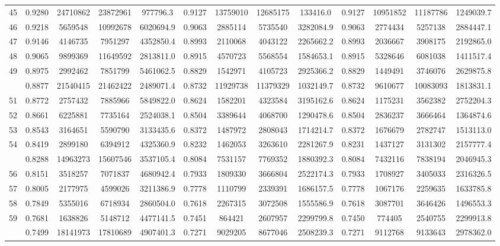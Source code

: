 \documentclass[
  12pt,
]{article}
\begin{document}
\begin{longtable}[t]{lcccccccccccc}
45 & 0.9280 & 24710862 & 23872961 & 977796.3 & 0.9127 & 13759010 & 12685175 & 133416.0 & 0.9127 & 10951852 & 11187786 & 1249039.7\\
46 & 0.9218 & 5659548 & 10992678 & 6020694.9 & 0.9063 & 2885114 & 5735540 & 3282084.9 & 0.9063 & 2774434 & 5257138 & 2884447.1\\
47 & 0.9146 & 4146735 & 7951297 & 4352850.4 & 0.8993 & 2110068 & 4043122 & 2265662.2 & 0.8993 & 2036667 & 3908175 & 2192865.0\\
48 & 0.9065 & 9899369 & 11649592 & 2813811.0 & 0.8915 & 4570723 & 5568554 & 1584653.1 & 0.8915 & 5328646 & 6081038 & 1411517.4\\
49 & 0.8975 & 2992462 & 7851799 & 5461062.5 & 0.8829 & 1542971 & 4105723 & 2925366.2 & 0.8829 & 1449491 & 3746076 & 2629875.8\\
\addlinespace
50 & 0.8877 & 21540415 & 21462422 & 2489071.4 & 0.8732 & 11929738 & 11379329 & 1032149.7 & 0.8732 & 9610677 & 10083093 & 1813831.1\\
51 & 0.8772 & 2757432 & 7885966 & 5849822.0 & 0.8624 & 1582201 & 4323584 & 3195162.6 & 0.8624 & 1175231 & 3562382 & 2752204.3\\
52 & 0.8661 & 6225881 & 7735164 & 2524038.1 & 0.8504 & 3389644 & 4068700 & 1290478.6 & 0.8504 & 2836237 & 3666464 & 1364874.6\\
53 & 0.8543 & 3164651 & 5590790 & 3133435.6 & 0.8372 & 1487972 & 2808043 & 1714214.7 & 0.8372 & 1676679 & 2782747 & 1513113.0\\
54 & 0.8419 & 2899180 & 6394912 & 4325360.9 & 0.8232 & 1462053 & 3263610 & 2281267.9 & 0.8231 & 1437127 & 3131302 & 2157777.4\\
\addlinespace
55 & 0.8288 & 14963273 & 15607546 & 3537105.4 & 0.8084 & 7531157 & 7769352 & 1880392.3 & 0.8084 & 7432116 & 7838194 & 2046945.3\\
56 & 0.8151 & 3518257 & 7071837 & 4680942.4 & 0.7933 & 1809330 & 3666804 & 2522174.3 & 0.7933 & 1708927 & 3405033 & 2316326.5\\
57 & 0.8005 & 2177975 & 4599026 & 3211386.9 & 0.7778 & 1110799 & 2339391 & 1686157.5 & 0.7778 & 1067176 & 2259635 & 1633785.8\\
58 & 0.7849 & 5355016 & 6718934 & 2860504.0 & 0.7618 & 2267315 & 3072508 & 1555586.9 & 0.7618 & 3087701 & 3646426 & 1496553.3\\
59 & 0.7681 & 1638826 & 5148712 & 4477141.5 & 0.7451 & 864421 & 2607957 & 2299799.8 & 0.7450 & 774405 & 2540755 & 2299913.8\\
\addlinespace
60 & 0.7499 & 18141973 & 17810689 & 4907401.3 & 0.7271 & 9029205 & 8677046 & 2508239.3 & 0.7271 & 9112768 & 9133643 & 2978362.0\\

\end{longtable}
\end{document}
